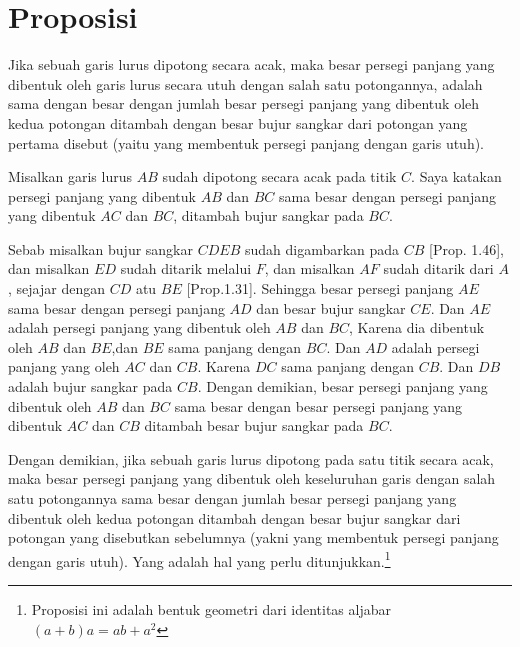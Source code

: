 \documentclass[a4paper]{book}
\begin{document}
\section*{\centering Proposisi \thesection} 
Jika sebuah garis lurus dipotong secara acak, maka besar persegi panjang yang dibentuk
oleh garis lurus secara utuh dengan salah satu potongannya, adalah sama dengan besar
dengan jumlah besar persegi panjang yang dibentuk oleh kedua potongan ditambah
dengan besar bujur sangkar dari potongan yang pertama disebut (yaitu yang membentuk 
persegi panjang dengan garis utuh).
\begin{center}
\end{center}
Misalkan garis lurus $AB$ sudah dipotong secara acak pada titik $C$. Saya katakan 
persegi panjang yang dibentuk $AB$ dan $BC$ sama besar dengan persegi panjang 
yang dibentuk $AC$ dan $BC$, ditambah bujur sangkar pada $BC$.

Sebab misalkan bujur sangkar $CDEB$ sudah digambarkan pada $CB$ [Prop. 1.46], 
dan misalkan $ED$ sudah ditarik melalui $F$, dan misalkan $AF$ sudah 
ditarik dari $A$, sejajar dengan $CD$ atu $BE$ [Prop.1.31]. Sehingga besar
persegi panjang $AE$ sama besar dengan persegi panjang $AD$ dan besar 
bujur sangkar $CE$. Dan $AE$ adalah persegi panjang yang dibentuk oleh
$AB$ dan $BC$, Karena dia dibentuk oleh $AB$ dan $BE$,dan $BE$ sama panjang
dengan $BC$. Dan $AD$ adalah persegi panjang yang oleh $AC$ dan $CB$. Karena
$DC$ sama panjang dengan $CB$. Dan $DB$ adalah bujur sangkar pada $CB$. Dengan
demikian, besar persegi panjang yang dibentuk oleh $AB$ dan $BC$ sama besar 
dengan besar persegi panjang yang dibentuk $AC$ dan $CB$ ditambah besar bujur
sangkar pada $BC$.

Dengan demikian, jika sebuah garis lurus dipotong pada satu titik secara acak, 
maka besar persegi panjang yang dibentuk oleh keseluruhan garis dengan salah satu
potongannya sama besar dengan jumlah besar persegi panjang yang dibentuk oleh 
kedua potongan ditambah dengan besar bujur sangkar dari potongan yang 
disebutkan sebelumnya (yakni yang membentuk persegi panjang dengan garis utuh). 
Yang adalah hal yang perlu ditunjukkan.\footnote{Proposisi ini adalah bentuk 
geometri dari identitas aljabar $(a+b)a = ab + a^2$}
\end{document}
